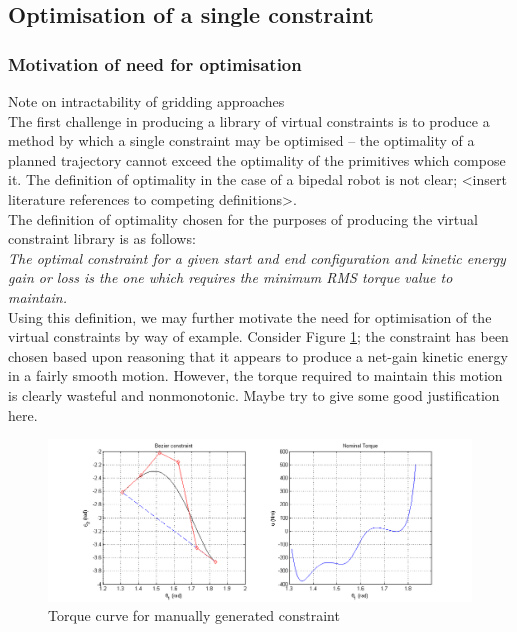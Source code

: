 \subsection{Optimisation of a single constraint}
\subsubsection{Motivation of need for optimisation}
Note on intractability of gridding approaches \\

The first challenge in producing a library of virtual constraints is to produce a method by which a single constraint may be optimised -- the optimality of a planned trajectory cannot exceed the optimality of the primitives which compose it. The definition of optimality in the case of a bipedal robot is not clear; {\color{red}<insert literature references to competing definitions>}. \\

The definition of optimality chosen for the purposes of producing the virtual constraint library is as follows: \\

\emph{The optimal constraint for a given start and end configuration and kinetic energy gain or loss is the one which requires the minimum RMS torque value to maintain.} \\

Using this definition, we may further motivate the need for optimisation of the virtual constraints by way of example. Consider Figure \ref{fig:manualgen}; the constraint has been chosen based upon reasoning that it appears to produce a net-gain kinetic energy in a fairly smooth motion. However, the torque required to maintain this motion is clearly wasteful and nonmonotonic. {\color{red} Maybe try to give some good justification here.}

\begin{figure}
	\centering
	\includegraphics[width=0.9\linewidth]{4VirtConstLib/manualgen.png}
	\caption{Torque curve for manually generated constraint}
	\label{fig:manualgen}
\end{figure}

